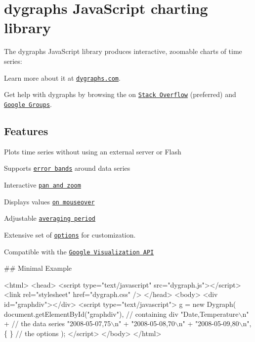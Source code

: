 \href{https://travis-ci.org/danvk/dygraphs}{\tt } \href{https://coveralls.io/r/danvk/dygraphs}{\tt } \hypertarget{md_src_nginx_node_modules_dygraphs_README_autotoc_md29}{}\section{dygraphs Java\+Script charting library}\label{md_src_nginx_node_modules_dygraphs_README_autotoc_md29}
The dygraphs Java\+Script library produces interactive, zoomable charts of time series\+:



Learn more about it at \href{http://www.dygraphs.com}{\tt dygraphs.\+com}.

Get help with dygraphs by browsing the on \href{http://stackoverflow.com/questions/tagged/dygraphs?sort=votes&pageSize=50}{\tt Stack Overflow} (preferred) and \href{http://groups.google.com/group/dygraphs-users}{\tt Google Groups}.\hypertarget{md_src_nginx_node_modules_dygraphs_README_autotoc_md30}{}\subsection{Features}\label{md_src_nginx_node_modules_dygraphs_README_autotoc_md30}

\begin{DoxyItemize}
\item Plots time series without using an external server or Flash
\item Supports \href{http://dygraphs.com/tests/legend-values.html}{\tt error bands} around data series
\item Interactive \href{http://dygraphs.com/tests/link-interaction.html}{\tt pan and zoom}
\item Displays values \href{http://dygraphs.com/tests/legend-values.html}{\tt on mouseover}
\item Adjustable \href{http://dygraphs.com/tests/temperature-sf-ny.html}{\tt averaging period}
\item Extensive set of \href{http://www.dygraphs.com/options.html}{\tt options} for customization.
\item Compatible with the \href{http://dygraphs.com/data.html#datatable}{\tt Google Visualization A\+PI}
\end{DoxyItemize}

\#\# Minimal Example 
\begin{DoxyCode}
<html>
<head>
<script type="text/javascript" src="dygraph.js"></script>
<link rel="stylesheet" href="dygraph.css" />
</head>
<body>
<div id="graphdiv"></div>
<script type="text/javascript">
  g = new Dygraph(
        document.getElementById("graphdiv"),  // containing div
        "Date,Temperature\(\backslash\)n" +                // the data series
        "2008-05-07,75\(\backslash\)n" +
        "2008-05-08,70\(\backslash\)n" +
        "2008-05-09,80\(\backslash\)n",
        \{ \}                                   // the options
      );
</script>
</body>
</html>
\end{DoxyCode}


